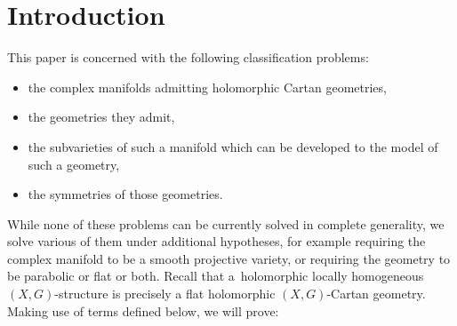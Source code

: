 \section{Introduction}

This paper is concerned with the following classification problems:
\begin{itemize}\itemsep=0pt
\item
the complex manifolds admitting holomorphic Cartan geometries,
\item
the geometries they admit,
\item
the subvarieties of such a manifold which can be developed to the model of such a geometry,
\item
the symmetries of those geometries.
\end{itemize}
While none of these problems can be currently solved in complete generality, we solve various of them under additional hypotheses, for example requiring the complex manifold to be a smooth projective variety, or requiring the geometry to be parabolic or flat or both.
Recall that a~holomorphic locally homogeneous $(X, G)$-structure is precisely a flat holomorphic $(X, G)$-Cartan geometry.
Making use of terms defined below, we will prove:
